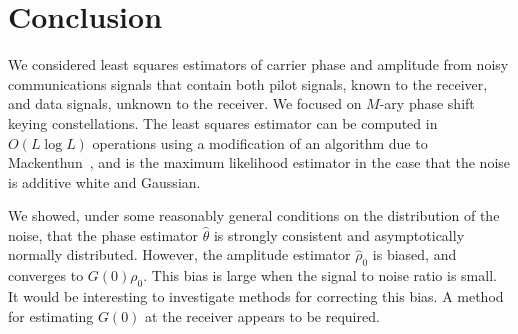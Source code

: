 \documentclass[draftcls, onecolumn, 11pt]{IEEEtran}
\begin{document}




\section{Conclusion}

We considered least squares estimators of carrier phase and amplitude from noisy communications signals that contain both pilot signals, known to the receiver, and data signals, unknown to the receiver.  We focused on $M$-ary phase shift keying constellations.  The least squares estimator can be computed in $O(L\log L)$ operations using a modification of an algorithm due to Mackenthun~\cite{Mackenthun1994}, and is the maximum likelihood estimator in the case that the noise is additive white and Gaussian.  

We showed, under some reasonably general conditions on the distribution of the noise, that the phase estimator $\hat{\theta}$ is strongly consistent and asymptotically normally distributed.  However, the amplitude estimator $\hat{\rho}_0$ is biased, and converges to $G(0)\rho_0$.  This bias is large when the signal to noise ratio is small.  It would be interesting to investigate methods for correcting this bias.  A method for estimating $G(0)$ at the receiver appears to be required.
\end{document}
